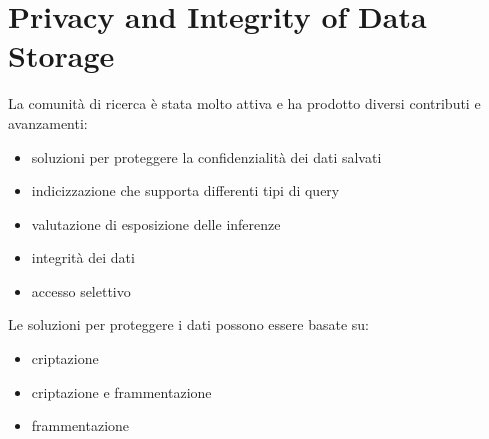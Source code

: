 \section{Privacy and Integrity of Data Storage}
La comunità di ricerca è stata molto attiva e ha prodotto diversi contributi e avanzamenti:
\begin{itemize}
    \item soluzioni per proteggere la confidenzialità dei dati salvati
    \item indicizzazione che supporta differenti tipi di query
    \item valutazione di esposizione delle inferenze
    \item integrità dei dati
    \item accesso selettivo 
\end{itemize}
Le soluzioni per proteggere i dati possono essere basate su:
\begin{itemize}
    \item criptazione
    \item criptazione e frammentazione
    \item frammentazione
\end{itemize}

